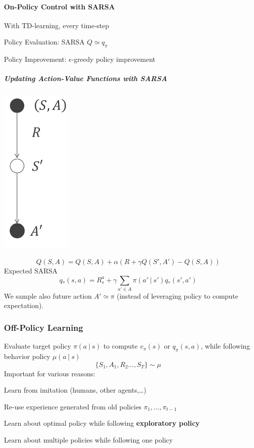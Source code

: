 \documentclass[10pt]{report}
\begin{document}
\paragraph{On-Policy Control with SARSA} With TD-learning, every time-step
\begin{list}{}{}
	\item Policy Evaluation: SARSA $Q\simeq q_\pi$
	\item Policy Improvement: $\epsilon$-greedy policy improvement
\end{list}
\subparagraph{Updating Action-Value Functions with SARSA}
\begin{center}
	\includegraphics[scale=0.5]{173.png}
\end{center}
$$Q(S,A)=Q(S,A)+\alpha(R+\gamma Q(S',A')-Q(S,A))$$
Expected SARSA
$$q_*(s,a) = R_s^a+\gamma\sum_{a'\in A}\pi(a'\:|\:s')q_*(s',a')$$
We sample also future action $A'\simeq \pi$ (instead of leveraging policy to compute expectation).
\subsubsection{Off-Policy Learning} Evaluate target policy $\pi(a\:|\:s)$ to compute $v_\pi(s)$ or $q_\pi(s,a)$, while following behavior policy $\mu(a\:|\:s)$
$$\{S_1,A_1,R_2\ldots,S_T\}\sim\mu$$
Important for various reasons:
\begin{list}{}{}
	\item Learn from imitation (humans, other agents,\ldots)
	\item Re-use experience generated from old policies $\pi_1,\ldots,\pi_{t-1}$
	\item Learn about optimal policy while following \textbf{exploratory policy}
	\item Learn about multiple policies while following one policy
\end{list}
\end{document}
